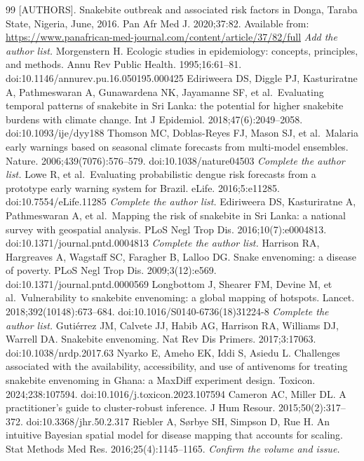 \documentclass[11pt,a4paper]{article}
\begin{document}
\begin{thebibliography}{99}
 {[}AUTHORS{]}. Snakebite outbreak and associated risk factors in Donga, Taraba State, Nigeria, June, 2016. Pan Afr Med J. 2020;37:82. Available from: \url{https://www.panafrican-med-journal.com/content/article/37/82/full} \emph{Add the author list.}
 Morgenstern H. Ecologic studies in epidemiology: concepts, principles, and methods. Annu Rev Public Health. 1995;16:61--81. doi:10.1146/annurev.pu.16.050195.000425
 Ediriweera DS, Diggle PJ, Kasturiratne A, Pathmeswaran A, Gunawardena NK, Jayamanne SF, et al.~Evaluating temporal patterns of snakebite in Sri Lanka: the potential for higher snakebite burdens with climate change. Int J Epidemiol. 2018;47(6):2049--2058. doi:10.1093/ije/dyy188
 Thomson MC, Doblas-Reyes FJ, Mason SJ, et al.~Malaria early warnings based on seasonal climate forecasts from multi-model ensembles. Nature. 2006;439(7076):576--579. doi:10.1038/nature04503 \emph{Complete the author list.}
 Lowe R, et al.~Evaluating probabilistic dengue risk forecasts from a prototype early warning system for Brazil. eLife. 2016;5:e11285. doi:10.7554/eLife.11285 \emph{Complete the author list.}
 Ediriweera DS, Kasturiratne A, Pathmeswaran A, et al.~Mapping the risk of snakebite in Sri Lanka: a national survey with geospatial analysis. PLoS Negl Trop Dis. 2016;10(7):e0004813. doi:10.1371/journal.pntd.0004813 \emph{Complete the author list.}
 Harrison RA, Hargreaves A, Wagstaff SC, Faragher B, Lalloo DG. Snake envenoming: a disease of poverty. PLoS Negl Trop Dis. 2009;3(12):e569. doi:10.1371/journal.pntd.0000569
 Longbottom J, Shearer FM, Devine M, et al.~Vulnerability to snakebite envenoming: a global mapping of hotspots. Lancet. 2018;392(10148):673--684. doi:10.1016/S0140-6736(18)31224-8 \emph{Complete the author list.}
 Gutiérrez JM, Calvete JJ, Habib AG, Harrison RA, Williams DJ, Warrell DA. Snakebite envenoming. Nat Rev Dis Primers. 2017;3:17063. doi:10.1038/nrdp.2017.63
 Nyarko E, Ameho EK, Iddi S, Asiedu L. Challenges associated with the availability, accessibility, and use of antivenoms for treating snakebite envenoming in Ghana: a MaxDiff experiment design. Toxicon. 2024;238:107594. doi:10.1016/j.toxicon.2023.107594
 Cameron AC, Miller DL. A practitioner's guide to cluster-robust inference. J Hum Resour. 2015;50(2):317--372. doi:10.3368/jhr.50.2.317
 Riebler A, Sørbye SH, Simpson D, Rue H. An intuitive Bayesian spatial model for disease mapping that accounts for scaling. Stat Methods Med Res. 2016;25(4):1145--1165. \emph{Confirm the volume and issue.}
\end{thebibliography}
\end{document}
